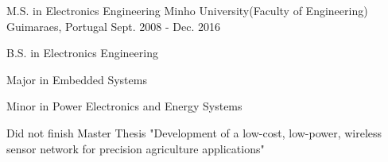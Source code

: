 

\begin{cventries}

  \cventry
    {M.S. in Electronics Engineering} %
    {Minho University(Faculty of Engineering)} %
    {Guimaraes, Portugal} %
    {Sept. 2008 - Dec. 2016} %
    {
      \begin{cvitems} %
        \item {B.S. in Electronics Engineering}
        \item {Major in Embedded Systems}
        \item {Minor in Power Electronics and Energy Systems}
        \item {Did not finish Master Thesis "Development of a low-cost, low-power, wireless sensor network for precision agriculture applications"}
      \end{cvitems}
    }

\end{cventries}
